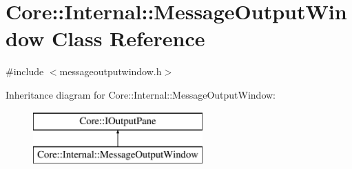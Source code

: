 \hypertarget{class_core_1_1_internal_1_1_message_output_window}{\section{\-Core\-:\-:\-Internal\-:\-:\-Message\-Output\-Window \-Class \-Reference}
\label{class_core_1_1_internal_1_1_message_output_window}
}


{\ttfamily \#include $<$messageoutputwindow.\-h$>$}

\-Inheritance diagram for \-Core\-:\-:\-Internal\-:\-:\-Message\-Output\-Window\-:\begin{figure}[H]
\begin{center}
\leavevmode
\includegraphics[height=2.000000cm]{class_core_1_1_internal_1_1_message_output_window}
\end{center}
\end{figure}
